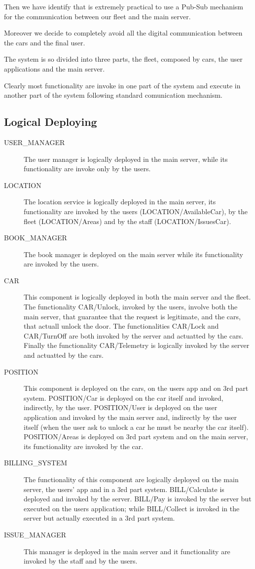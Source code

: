 \documentclass[11pt]{article} %
\begin{document}
Then we have identify that is extremely practical to use a Pub-Sub mechanism for the communication between our fleet and the main server.

Moreover we decide to completely avoid all the digital communication between the cars and the final user.

The system is so divided into three parts, the fleet, composed by cars, the user applications and the main server.

Clearly most functionality are invoke in one part of the system and execute in another part of the system following standard comunication mechanism.

\subsection{Logical Deploying}

\begin{description}
	\item[USER\_MANAGER] The user manager is logically deployed in the main server, while its functionality are invoke only by the users.
	\item[LOCATION] The location service is logically deployed in the main server, its functionality are invoked by the users (LOCATION/AvailableCar), by the fleet (LOCATION/Areas) and by the staff (LOCATION/IssuesCar).
	\item[BOOK\_MANAGER] The book manager is deployed on the main server while its functionality are invoked by the users.
	\item[CAR] This component is logically deployed in both the main server and the fleet.
	The functionality CAR/Unlock, invoked by the users, involve both the main server, that guarantee that the request is legitimate, and the cars, that actuall unlock the door.
	The functionalities CAR/Lock and CAR/TurnOff are both invoked by the server and actuatted by the cars.
	Finally the functionality CAR/Telemetry is logically invoked by the server and actuatted by the cars.
	\item[POSITION] This component is deployed on the cars, on the users app and on 3rd part system. POSITION/Car is deployed on the car itself and invoked, indirectly, by the user. POSITION/User is deployed on the user application and invoked by the main server and, indirectly by the user itself (when the user ask to unlock a car he must be nearby the car itself). POSITION/Areas is deployed on 3rd part system and on the main server, its functionality are invoked by the car.
	\item[BILLING\_SYSTEM] The functionality of this component are logically deployed on the main server, the users' app and in a 3rd part system. BILL/Calculate is deployed and invoked by the server. BILL/Pay is invoked by the server but executed on the users application; while BILL/Collect is invoked in the server but actually executed in a 3rd part system.
	\item[ISSUE\_MANAGER] This manager is deployed in the main server and it functionality are invoked by the staff and by the users.
\end{description}
	
\end{document}
